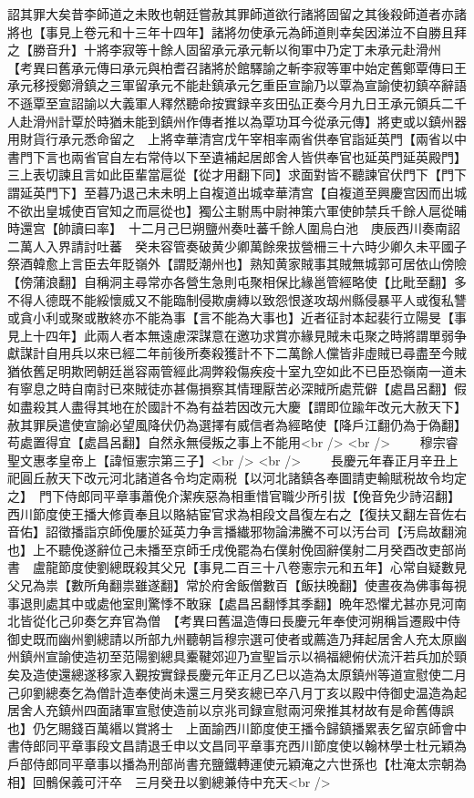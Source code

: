 詔其罪大矣昔李師道之未敗也朝廷嘗赦其罪師道欲行諸將固留之其後殺師道者亦諸將也【事見上卷元和十三年十四年】諸將勿使承元為師道則幸矣因涕泣不自勝且拜之【勝音升】十將李寂等十餘人固留承元承元斬以徇軍中乃定丁未承元赴滑州　【考異曰舊承元傳曰承元與柏耆召諸將於館驛諭之斬李寂等軍中始定舊鄭覃傳曰王承元移授鄭滑鎮之三軍留承元不能赴鎮承元乞重臣宣諭乃以覃為宣諭使初鎮卒辭語不遜覃至宣詔諭以大義軍人釋然聽命按實録辛亥田弘正奏今月九日王承元領兵二千人赴滑州計覃於時猶未能到鎮州作傳者推以為覃功耳今從承元傳】將吏或以鎮州器用財貨行承元悉命留之　上將幸華清宫戊午宰相率兩省供奉官詣延英門【兩省以中書門下言也兩省官自左右常侍以下至遺補起居郎舍人皆供奉官也延英門延英殿門】三上表切諫且言如此臣輩當扈從【從才用翻下同】求面對皆不聽諫官伏門下【門下謂延英門下】至暮乃退己未未明上自複道出城幸華清宫【自複道至興慶宫因而出城不欲出皇城使百官知之而扈從也】獨公主駙馬中尉神策六軍使帥禁兵千餘人扈從晡時還宫【帥讀曰率】　十二月己巳朔鹽州奏吐蕃千餘人圍烏白池　庚辰西川奏南詔二萬人入界請討吐蕃　癸未容管奏破黄少卿萬餘衆拔營柵三十六時少卿久未平國子祭酒韓愈上言臣去年貶嶺外【謂貶潮州也】熟知黄家賊事其賊無城郭可居依山傍險【傍蒲浪翻】自稱洞主尋常亦各營生急則屯聚相保比緣邕管經略使【比毗至翻】多不得人德既不能綏懷威又不能臨制侵欺虜縳以致怨恨遂攻刼州縣侵暴平人或復私讐或貪小利或聚或散終亦不能為事【言不能為大事也】近者征討本起裴行立陽旻【事見上十四年】此兩人者本無遠慮深謀意在邀功求賞亦緣見賊未屯聚之時將謂單弱争獻謀計自用兵以來已經二年前後所奏殺獲計不下二萬餘人儻皆非虛賊已尋盡至今賊猶依舊足明欺罔朝廷邕容兩管經此凋弊殺傷疾疫十室九空如此不已臣恐嶺南一道未有寧息之時自南討已來賊徒亦甚傷損察其情理厭苦必深賊所處荒僻【處昌呂翻】假如盡殺其人盡得其地在於國計不為有益若因改元大慶【謂即位踰年改元大赦天下】赦其罪戾遣使宣諭必望風降伏仍為選擇有威信者為經略使【降戶江翻仍為于偽翻】苟處置得宜【處昌呂翻】自然永無侵叛之事上不能用<br />
<br />
　　穆宗睿聖文惠孝皇帝上【諱恒憲宗第三子】<br />
<br />
　　長慶元年春正月辛丑上祀圓丘赦天下改元河北諸道各令均定兩税【以河北諸鎮各奉圖請吏輸賦税故令均定之】　門下侍郎同平章事蕭俛介潔疾惡為相重惜官職少所引拔【俛音免少詩沼翻】西川節度使王播大修貢奉且以賂結宦官求為相段文昌復左右之【復扶又翻左音佐右音佑】詔徵播詣京師俛屢於延英力争言播纎邪物論沸騰不可以汚台司【汚烏故翻涴也】上不聽俛遂辭位己未播至京師壬戌俛罷為右僕射俛固辭僕射二月癸酉改吏部尚書　盧龍節度使劉總既殺其父兄【事見二百三十八卷憲宗元和五年】心常自疑數見父兄為祟【數所角翻祟雖遂翻】常於府舍飯僧數百【飯扶晚翻】使晝夜為佛事每視事退則處其中或處他室則驚悸不敢寐【處昌呂翻悸其季翻】晩年恐懼尤甚亦見河南北皆從化己卯奏乞弃官為僧　【考異曰舊温造傳曰長慶元年奉使河朔稱旨遷殿中侍御史既而幽州劉總請以所部九州聽朝旨穆宗選可使者或薦造乃拜起居舍人充太原幽州鎮州宣諭使造初至范陽劉總具櫜鞬郊迎乃宣聖旨示以禍福總俯伏流汗若兵加於頸矣及造使還總遂移家入覲按實録長慶元年正月乙巳以造為太原鎮州等道宣慰使二月己卯劉總奏乞為僧計造奉使尚未還三月癸亥總已卒八月丁亥以殿中侍御史温造為起居舍人充鎮州四面諸軍宣慰使造前以京兆司録宣慰兩河衆推其材故有是命舊傳誤也】仍乞賜錢百萬緡以賞將士　上面諭西川節度使王播令歸鎮播累表乞留京師會中書侍郎同平章事段文昌請退壬申以文昌同平章事充西川節度使以翰林學士杜元穎為戶部侍郎同平章事以播為刑部尚書充鹽鐵轉運使元穎淹之六世孫也【杜淹太宗朝為相】回鶻保義可汗卒　三月癸丑以劉總兼侍中充天<br />
